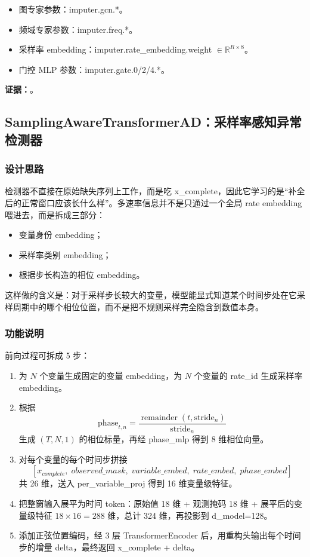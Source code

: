 \documentclass[11pt,a4paper]{ctexart}
\newcommand{\code}[1]{{\ttfamily\small #1}}
\newcommand{\evidence}[1]{\textbf{证据：}#1}
\begin{document}
\begin{itemize}
  \item 图专家参数：\code{imputer.gcn.*}。
  \item 频域专家参数：\code{imputer.freq.*}。
  \item 采样率 embedding：\code{imputer.rate\_embedding.weight} $\in \mathbb{R}^{R \times 8}$。
  \item 门控 MLP 参数：\code{imputer.gate.0/2/4.*}。
\end{itemize}

\evidence{。}

\subsection{SamplingAwareTransformerAD：采样率感知异常检测器}

\subsubsection{设计思路}

检测器不直接在原始缺失序列上工作，而是吃 \code{x\_complete}，因此它学习的是“补全后的正常窗口应该长什么样”。多速率信息并不是只通过一个全局 rate embedding 喂进去，而是拆成三部分：
\begin{itemize}
  \item 变量身份 embedding；
  \item 采样率类别 embedding；
  \item 根据步长构造的相位 embedding。
\end{itemize}

这样做的含义是：对于采样步长较大的变量，模型能显式知道某个时间步处在它采样周期中的哪个相位位置，而不是把不规则采样完全隐含到数值本身。

\subsubsection{功能说明}

前向过程可拆成 5 步：
\begin{enumerate}
  \item 为 $N$ 个变量生成固定的变量 embedding，为 $N$ 个变量的 \code{rate\_id} 生成采样率 embedding。
  \item 根据
  \[
  \text{phase}_{t,n} = \frac{\operatorname{remainder}(t, \text{stride}_n)}{\text{stride}_n}
  \]
  生成 $(T,N,1)$ 的相位标量，再经 \code{phase\_mlp} 得到 8 维相位向量。
  \item 对每个变量的每个时间步拼接
  \[
  [x_{complete},\; observed\_mask,\; variable\_embed,\; rate\_embed,\; phase\_embed]
  \]
  共 26 维，送入 \code{per\_variable\_proj} 得到 16 维变量级特征。
  \item 把整窗输入展平为时间 token：原始值 18 维 + 观测掩码 18 维 + 展平后的变量级特征 $18 \times 16 = 288$ 维，总计 324 维，再投影到 \code{d\_model=128}。
  \item 添加正弦位置编码，经 3 层 \code{TransformerEncoder} 后，用重构头输出每个时间步的增量 \code{delta}，最终返回 \code{x\_complete + delta}。
\end{enumerate}
\end{document}
